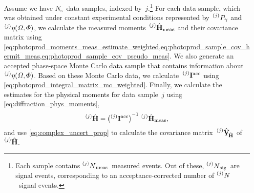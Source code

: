 Assume we have $N_\text{s}$~data samples, indexed
by~$j$.\footnote{Each sample contains
$\prescript{(j)}{}{N}_\text{meas}$~measured events. Out of these,
$\prescript{(j)}{}{N}_\text{sig}$~are signal events, corresponding to
an acceptance-corrected number of $\prescript{(j)}{}{N}$~signal
events.}  For each data sample, which was obtained under constant
experimental conditions represented by~$\prescript{(j)}{}{P_\gamma}$
and $\prescript{(j)}{}{\eta}(\Omega, \Phi)$, we calculate the measured
moments~$\prescript{(j)}{}{\vphantom{\vect{H}}}\hat{\vect{H}}_\text{meas}$
and their covariance matrix using
\cref{eq:photoprod_moments_meas_estimate_weighted,eq:photoprod_sample_cov_hermit_meas,eq:photoprod_sample_cov_pseudo_meas}.
We also generate an accepted phase-space Monte Carlo data sample that
contains information about $\prescript{(j)}{}{\eta}(\Omega, \Phi)$.
Based on these Monte Carlo data, we
calculate~$\prescript{(j)}{}{\ensuremath{\bm{\mathrm{I}}}}^\text{acc}$ using
\cref{eq:photoprod_integral_matrix_mc_weighted}.  Finally, we
calculate the estimates for the physical moments for data sample~$j$
using \cref{eq:diffraction_phys_moments}, \ie
\begin{equation}
  \label{eq:photoprod_data_sample_phys_moments}
  \prescript{(j)}{}{\vphantom{\vect{H}}}\hat{\vect{H}}
  = \rBrk[1]{\prescript{(j)}{}{\mat{I}}^\text{acc}}^{-1}\,
  \prescript{(j)}{}{\vphantom{\vect{H}}}\hat{\vect{H}}_\text{meas},
\end{equation}
and use \cref{eq:complex_uncert_prop} to calculate the covariance
matrix~$\prescript{(j)}{}{\vphantom{\vect{H}}}\hat{\underaccent{\bar}{\covMatSym}}_{\!\hat{\vect{H}}}$
of~$\prescript{(j)}{}{\vphantom{\vect{H}}}\hat{\vect{H}}$.

